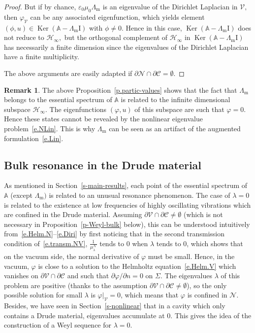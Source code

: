 \documentclass[10pt]{amsart}
\theoremstyle{definition}
\newtheorem{rema}[cdrthm]{Remark}
\DeclareMathOperator{\Ker}{Ker}
\newcommand{\epsl}{\varepsilon}
\newcommand{\calC}{\mathcal{C}}
\newcommand{\calH}{\mathcal{H}}
\newcommand{\calN}{\mathcal{N}}
\newcommand{\calV}{\mathcal{V}}
\newcommand{\bbA}{\mathbb{A}}
\newcommand{\Ident}{{\mathrm{I}}}
\newcommand{\Lm}{{\Lambda_{\mathrm{m}}}}
\begin{document}
\begin{proof}
But if by chance, $\epsl_0 \mu_0 \Lm$ is an eigenvalue of the Dirichlet Laplacian in $\calV,$ then $\varphi_\calV$ can be any associated eigenfunction, which yields element $(\phi,u) \in \Ker(\bbA - \Lm\Ident)$ with $\phi \neq 0.$ Hence in this case, $\Ker(\bbA - \Lm\Ident)$ does not reduce to $\calH_\infty,$ but the orthogonal complement of $\calH_\infty$ in $\Ker(\bbA - \Lm\Ident)$ has necessarily a finite dimension since the eigenvalues of the Dirichlet Laplacian have a finite multiplicity.

The above arguments are easily adapted if $\partial\calN \cap \partial\calC = \emptyset.$
\end{proof}

\begin{rema}\label{r-artifact}
The above Proposition~\ref{p.partic-values} shows that the fact that $\Lm$ belongs to the essential spectrum of $\bbA$ is related to the infinite dimensional subspace $\calH_\infty.$ The eigenfunctions $(\varphi,u)$ of this subspace are such that $\varphi = 0.$ Hence these states cannot be revealed by the nonlinear eigenvalue problem~\eqref{e.NLin}. This is why $\Lm$ can be seen as an artifact of the augmented formulation~\eqref{e.Lin}.
\end{rema}


\subsection{Bulk resonance in the Drude material}\label{s-bulk-reson}

As mentioned in Section~\ref{s-main-results}, each point of the essential spectrum of $\bbA$ (except $\Lm)$ is related to an unusual resonance phenomenon. The case of $\lambda = 0$ is related to the existence at low frequencies of highly oscillating vibrations which are confined in the Drude material. Assuming $\partial\calV \cap \partial\calC \neq \emptyset$ (which is not necessary in Proposition~\ref{p-Weyl-bulk} below), this can be understood intuitively from~\eqref{e.Helm.N}--\eqref{e.Diri} by first noticing that in the second transmission condition of~\eqref{e.transm.NV}, $\frac{1}{\mu_\lambda^\calN}$ tends to $0$ when $\lambda$ tends to $0$, which shows that on the vacuum side, the normal derivative of $\varphi$ must be small. Hence, in the vacuum, $\varphi$ is close to a solution to the Helmholtz equation~\eqref{e.Helm.V} which vanishes on $\partial\calV \cap \partial\calC$ and such that $\partial\varphi/\partial n = 0$ on $\Sigma.$ The eigenvalues $\lambda$ of this problem are positive (thanks to the assumption $\partial\calV \cap \partial\calC \neq \emptyset$), so the only possible solution for small $\lambda$ is $\varphi|_\calV = 0$, which means that $\varphi$ is confined in $\calN.$ Besides, we have seen in Section~\ref{s-nonlinear} that in a cavity which only contains a Drude material, eigenvalues accumulate at 0. This gives the idea of the construction of a Weyl sequence for $\lambda = 0.$
\end{document}
